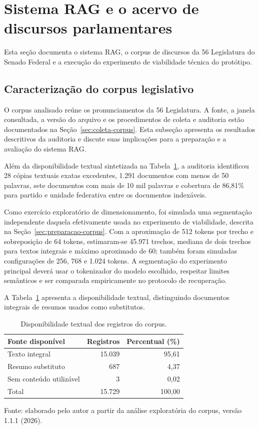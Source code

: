 \section{Sistema RAG e o acervo de discursos parlamentares}\label{sec:caso}

Esta seção documenta o sistema RAG, o corpus de discursos da 56\textordfeminine{} Legislatura do Senado Federal e a execução do experimento de viabilidade técnica do protótipo.

\subsection{Caracterização do corpus legislativo}\label{sec:caracterizacao-corpus}

O corpus analisado reúne os pronunciamentos da 56\textordfeminine{} Legislatura. A fonte, a janela consultada, a versão do arquivo e os procedimentos de coleta e auditoria estão documentados na Seção~\ref{sec:coleta-corpus}. Esta subseção apresenta os resultados descritivos da auditoria e discute suas implicações para a preparação e a avaliação do sistema RAG.

Além da disponibilidade textual sintetizada na Tabela~\ref{tab:cobertura-corpus}, a auditoria identificou 28 cópias textuais exatas excedentes, 1.291 documentos com menos de 50 palavras, sete documentos com mais de 10 mil palavras e cobertura de 86,81\% para partido e unidade federativa entre os documentos indexáveis.

Como exercício exploratório de dimensionamento, foi simulada uma segmentação independente daquela efetivamente usada no experimento de viabilidade, descrita na Seção~\ref{sec:preparacao-corpus}. Com a aproximação de 512 tokens por trecho e sobreposição de 64 tokens, estimaram-se 45.971 trechos, mediana de dois trechos para textos integrais e máximo aproximado de 60; também foram simuladas configurações de 256, 768 e 1.024 tokens. A segmentação do experimento principal deverá usar o tokenizador do modelo escolhido, respeitar limites semânticos e ser comparada empiricamente no protocolo de recuperação.

A Tabela~\ref{tab:cobertura-corpus} apresenta a disponibilidade textual, distinguindo documentos integrais de resumos usados como substitutos.

\begin{table}[htbp]
\centering
\caption{Disponibilidade textual dos registros do corpus.}\label{tab:cobertura-corpus}
\begin{tabular}{lrr}\toprule
Fonte disponível & Registros & Percentual (\%)\\\midrule
Texto integral & 15.039 & 95,61\\
Resumo substituto & 687 & 4,37\\
Sem conteúdo utilizável & 3 & 0,02\\\midrule
Total & 15.729 & 100,00\\\bottomrule
\end{tabular}
\par\smallskip Fonte: elaborado pelo autor a partir da análise exploratória do corpus, versão 1.1.1 (2026).
\end{table}

